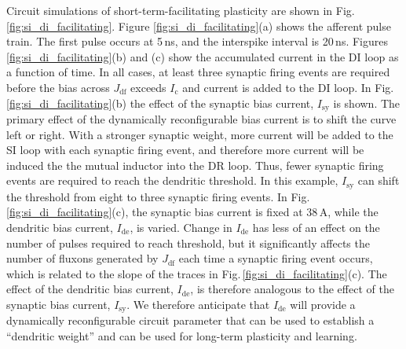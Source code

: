 \documentclass[twocolumn]{article}
\begin{document}
Circuit simulations of short-term-facilitating plasticity are shown in Fig.\,\ref{fig:si_di_facilitating}. Figure \ref{fig:si_di_facilitating}(a) shows the afferent pulse train. The first pulse occurs at 5\,ns, and the interspike interval is 20\,ns. Figures \ref{fig:si_di_facilitating}(b) and (c) show the accumulated current in the DI loop as a function of time. In all cases, at least three synaptic firing events are required before the bias across $J_{\mathrm{df}}$ exceeds $I_{\mathrm{c}}$ and current is added to the DI loop. In Fig.\,\ref{fig:si_di_facilitating}(b) the effect of the synaptic bias current, $I_{\mathrm{sy}}$ is shown. The primary effect of the dynamically reconfigurable bias current is to shift the curve left or right. With a stronger synaptic weight, more current will be added to the SI loop with each synaptic firing event, and therefore more current will be induced the the mutual inductor into the DR loop. Thus, fewer synaptic firing events are required to reach the dendritic threshold. In this example, $I_{\mathrm{sy}}$ can shift the threshold from eight to three synaptic firing events. In Fig.\,\ref{fig:si_di_facilitating}(c), the synaptic bias current is fixed at 38\,\textmu A, while the dendritic bias current, $I_{\mathrm{de}}$, is varied. Change in $I_{\mathrm{de}}$ has less of an effect on the number of pulses required to reach threshold, but it significantly affects the number of fluxons generated by $J_{\mathrm{df}}$ each time a synaptic firing event occurs, which is related to the slope of the traces in Fig.\,\ref{fig:si_di_facilitating}(c). The effect of the dendritic bias current, $I_{\mathrm{de}}$, is therefore analogous to the effect of the synaptic bias current, $I_{\mathrm{sy}}$. We therefore anticipate that $I_{\mathrm{de}}$ will provide a dynamically reconfigurable circuit parameter that can be used to establish a ``dendritic weight'' and can be used for long-term plasticity and learning. 
\begin{figure} 
\end{figure}
\end{document}
